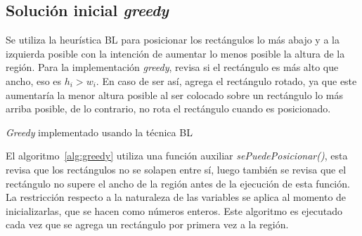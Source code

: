 \documentclass[letter, 10pt]{article}
\begin{document}
\subsection{Soluci\'on inicial \emph{greedy}}

Se utiliza la heur\'istica BL para posicionar los rect\'angulos lo m\'as abajo y a la izquierda posible con la intenci\'on de aumentar lo menos posible la altura de la regi\'on. Para la implementaci\'on \emph{greedy}, revisa si el rect\'angulo es m\'as alto que ancho, eso es $h_i > w_i$. En caso de ser as\'i, agrega el rect\'angulo rotado, ya que este aumentar\'ia la menor altura posible al ser colocado sobre un rect\'angulo lo m\'as arriba posible, de lo contrario, no rota el rect\'angulo cuando es posicionado.
\vspace{0.2cm}

\begin{algorithm}[H]
\caption{\emph{Greedy} implementado usando la t\'ecnica BL}
\label{alg:greedy}

\SetNoFillComment 



\end{algorithm}
\vspace{0.2cm}

El algoritmo~\ref{alg:greedy} utiliza una funci\'on auxiliar \emph{sePuedePosicionar()}, esta revisa que los rect\'angulos no se solapen entre s\'i, luego tambi\'en se revisa que el rect\'angulo no supere el ancho de la regi\'on antes de la ejecuci\'on de esta funci\'on. La restricci\'on respecto a la naturaleza de las variables se aplica al momento de inicializarlas, que se hacen como n\'umeros enteros. Este algoritmo es ejecutado cada vez que se agrega un rect\'angulo por primera vez a la regi\'on.
\end{document}
